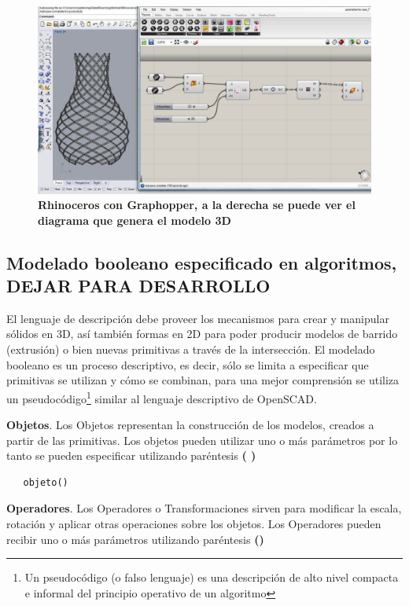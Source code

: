 \begin{figure}[h]
\includegraphics[width=14cm]{Img/CPD/rhinoc.jpg}
\centering
\caption{\textbf{\footnotesize{Rhinoceros con Graphopper, a la derecha se puede ver el diagrama que genera el modelo 3D}}}
\end{figure}

\subsection{Modelado booleano especificado en algoritmos, DEJAR PARA DESARROLLO}

El lenguaje de descripción debe proveer los mecanismos para crear y manipular sólidos en 3D, así también formas en 2D para poder producir modelos de barrido (extrusión) o bien nuevas primitivas a través de la intersección. El  modelado  booleano  es  un proceso  descriptivo,  es  decir,  sólo  se limita  a  especificar que primitivas se utilizan y cómo se combinan, para una mejor comprensión se utiliza un pseudocódigo\footnote{Un pseudocódigo (o falso lenguaje) es una descripción de alto nivel compacta e informal del principio operativo de un algoritmo} similar al lenguaje descriptivo de OpenSCAD.

\textbf{Objetos}. Los Objetos representan la construcción de los modelos, creados a partir  de las primitivas. Los objetos pueden utilizar uno o más parámetros por lo tanto se pueden especificar utilizando paréntesis \textbf{( )}

\begin{verbatim}
   objeto()
\end{verbatim}


\textbf{Operadores}. Los Operadores o Transformaciones sirven para modificar la escala, rotación y aplicar otras operaciones sobre los objetos. Los Operadores pueden recibir uno o más parámetros utilizando paréntesis \textbf{()}

